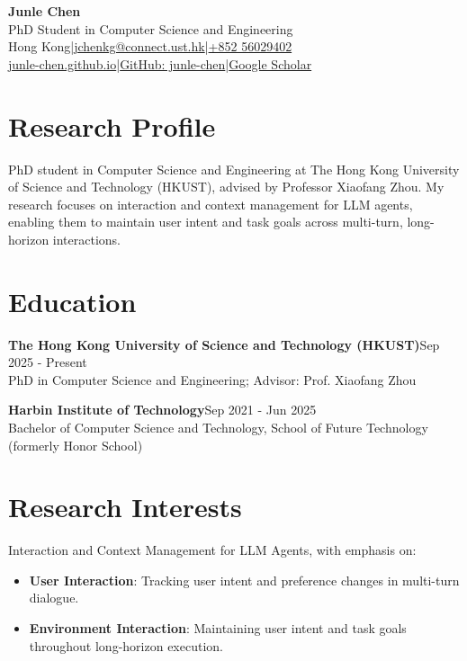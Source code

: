 \documentclass[10pt,a4paper]{article}
\begin{document}
\fontsize{9.7}{11.2}\selectfont
\begin{center}
{\fontsize{24}{26}\selectfont\bfseries Junle Chen}\\[1pt]
{\large PhD Student in Computer Science and Engineering}\\[3pt]
Hong Kong\enspace|\enspace \href{mailto:jchenkg@connect.ust.hk}{jchenkg@connect.ust.hk}\enspace|\enspace \href{tel:+85256029402}{+852 56029402}\\[1pt]
\href{https://junle-chen.github.io}{junle-chen.github.io}\enspace|\enspace \href{https://github.com/junle-chen}{GitHub: junle-chen}\enspace|\enspace \href{https://scholar.google.com/citations?user=EjiEmLUAAAAJ&hl=zh-CN}{Google Scholar}
\end{center}
\vspace{-8pt}
\section*{Research Profile}

PhD student in Computer Science and Engineering at The Hong Kong University of Science and Technology (HKUST), advised by Professor Xiaofang Zhou. My research focuses on interaction and context management for LLM agents, enabling them to maintain user intent and task goals across multi-turn, long-horizon interactions.
\section*{Education}

\noindent\textbf{The Hong Kong University of Science and Technology (HKUST)}\hfill Sep 2025 - Present\\
PhD in Computer Science and Engineering; Advisor: Prof. Xiaofang Zhou\par\vspace{3pt}
\noindent\textbf{Harbin Institute of Technology}\hfill Sep 2021 - Jun 2025\\
Bachelor of Computer Science and Technology, School of Future Technology (formerly Honor School)\par\vspace{3pt}
\section*{Research Interests}

Interaction and Context Management for LLM Agents, with emphasis on:
\begin{itemize}[leftmargin=12pt,itemsep=1pt,topsep=2pt]
\item \textbf{User Interaction}: Tracking user intent and preference changes in multi-turn dialogue.
\item \textbf{Environment Interaction}: Maintaining user intent and task goals throughout long-horizon execution.
\end{itemize}
\end{document}
